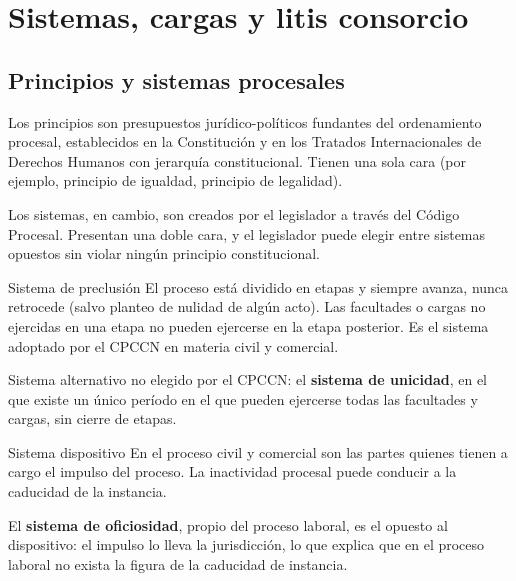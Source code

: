 \documentclass[12pt,oneside]{book}
\begin{document}
\chapter{Sistemas, cargas y litis consorcio}

\section{Principios y sistemas procesales}

Los principios son presupuestos jurídico-políticos fundantes del ordenamiento procesal, establecidos en la Constitución y en los Tratados Internacionales de Derechos Humanos con jerarquía constitucional. Tienen una sola cara (por ejemplo, principio de igualdad, principio de legalidad).

Los sistemas, en cambio, son creados por el legislador a través del Código Procesal. Presentan una doble cara, y el legislador puede elegir entre sistemas opuestos sin violar ningún principio constitucional.

\begin{definition}{Sistema de preclusión}
El proceso está dividido en etapas y siempre avanza, nunca retrocede (salvo planteo de nulidad de algún acto). Las facultades o cargas no ejercidas en una etapa no pueden ejercerse en la etapa posterior. Es el sistema adoptado por el CPCCN en materia civil y comercial.
\end{definition}

\begin{note}
Sistema alternativo no elegido por el CPCCN: el \textbf{sistema de unicidad}, en el que existe un único período en el que pueden ejercerse todas las facultades y cargas, sin cierre de etapas.
\end{note}

\begin{definition}{Sistema dispositivo}
En el proceso civil y comercial son las partes quienes tienen a cargo el impulso del proceso. La inactividad procesal puede conducir a la caducidad de la instancia.
\end{definition}

\begin{note}
El \textbf{sistema de oficiosidad}, propio del proceso laboral, es el opuesto al dispositivo: el impulso lo lleva la jurisdicción, lo que explica que en el proceso laboral no exista la figura de la caducidad de instancia.
\end{note}
\end{document}

